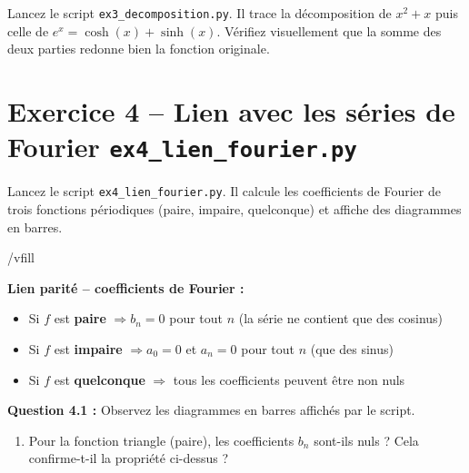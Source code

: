 \documentclass[12pt,a4paper]{article}
\begin{document}
\begin{fichierbox}
Lancez le script \texttt{ex3\_decomposition.py}. Il trace la décomposition de $x^2+x$ puis celle de $e^x = \cosh(x) + \sinh(x)$. Vérifiez visuellement que la somme des deux parties redonne bien la fonction originale.
\end{fichierbox}


\section{Exercice 4 -- Lien avec les séries de Fourier \hfill\normalsize\texttt{ex4\_lien\_fourier.py}}

\begin{fichierbox}
Lancez le script \texttt{ex4\_lien\_fourier.py}. Il calcule les coefficients de Fourier de trois fonctions périodiques (paire, impaire, quelconque) et affiche des diagrammes en barres.
\end{fichierbox}

/vfill 


\begin{rappelbox}
\textbf{Lien parité -- coefficients de Fourier :} \\[4mm]
\begin{itemize}
    \item Si $f$ est \textbf{paire} $\Rightarrow b_n = 0$ pour tout $n$ (la série ne contient que des cosinus) \\[2mm]
    
    
    \item Si $f$ est \textbf{impaire} $\Rightarrow a_0 = 0$ et $a_n = 0$ pour tout $n$ (que des sinus)\\[2mm]
    
    \item Si $f$ est \textbf{quelconque} $\Rightarrow$ tous les coefficients peuvent être non nuls \\[2mm]
\end{itemize}
\end{rappelbox}

\vfill 




\begin{exercicebox}
\textbf{Question 4.1 :} Observez les diagrammes en barres affichés par le script.

\medskip
\begin{enumerate}[label=\alph*)]
    \item Pour la fonction triangle (paire), les coefficients $b_n$ sont-ils nuls ? Cela confirme-t-il la propriété ci-dessus ?
\end{enumerate}
\end{exercicebox}
\end{document}
